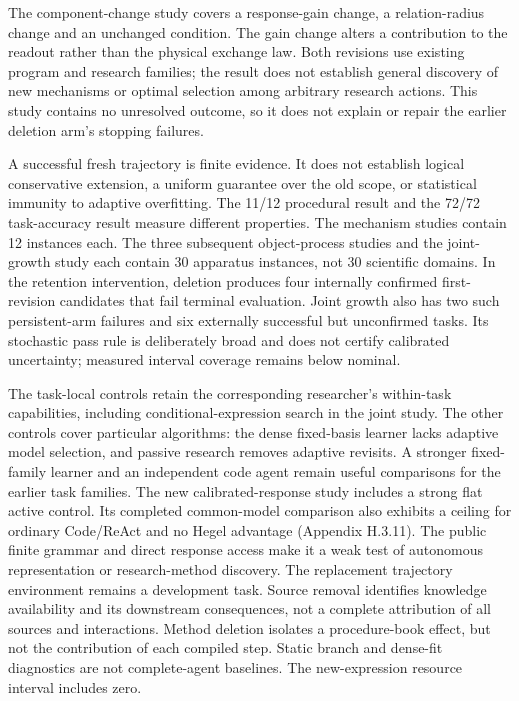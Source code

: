 \documentclass[twoside,11pt]{article}
\begin{document}
The component-change study covers a response-gain change, a relation-radius change and an unchanged condition. The gain change alters a contribution to the readout rather than the physical exchange law. Both revisions use existing program and research families; the result does not establish general discovery of new mechanisms or optimal selection among arbitrary research actions. This study contains no unresolved outcome, so it does not explain or repair the earlier deletion arm's stopping failures.


A successful fresh trajectory is finite evidence. It does not establish logical
conservative extension, a uniform guarantee over the old scope, or statistical
immunity to adaptive overfitting. The 11/12 procedural result and the 72/72
task-accuracy result measure different properties. The mechanism studies contain
12 instances each. The three subsequent object-process studies and the
joint-growth study each contain 30 apparatus instances, not 30 scientific
domains. In the retention intervention, deletion produces four internally
confirmed first-revision candidates that fail terminal evaluation. Joint growth
also has two such persistent-arm failures and six externally successful but
unconfirmed tasks. Its stochastic pass rule is deliberately broad and does not
certify calibrated uncertainty; measured interval coverage remains below nominal.


The task-local controls retain the corresponding researcher's within-task
capabilities, including conditional-expression search in the joint study. The
other controls cover particular algorithms: the dense fixed-basis learner lacks
adaptive model selection, and passive research removes adaptive revisits. A
stronger fixed-family learner and an independent code agent remain useful
comparisons for the earlier task families. The new calibrated-response study
includes a strong flat active control. Its completed common-model comparison
also exhibits a ceiling for ordinary Code/ReAct and no Hegel advantage (Appendix
H.3.11). The public finite grammar and direct response access make it a weak test
of autonomous representation or research-method discovery. The replacement
trajectory environment remains a development task.
Source removal identifies knowledge availability and its downstream
consequences, not a complete attribution of all sources and interactions. Method
deletion isolates a procedure-book effect, but not the contribution of each
compiled step. Static branch and dense-fit diagnostics are not complete-agent
baselines. The new-expression resource interval includes zero.
\end{document}
